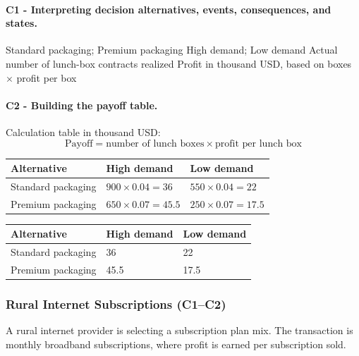 	\paragraph*{C1 - Interpreting decision alternatives, events, consequences, and states.}
	\label{subsec:problem6-community-bakery-lunch-boxes-c1}
	\DecisionElementsTable
	{Standard packaging; Premium packaging}
	{High demand; Low demand}
	{Actual number of lunch-box contracts realized}
	{Profit in thousand USD, based on boxes $\times$ profit per box}


	\paragraph*{C2 - Building the payoff table.}
	\label{subsec:problem6-community-bakery-lunch-boxes-c2}
	Calculation table in thousand USD:
	\[
	\text{Payoff}=\text{number of lunch boxes}\times\text{profit per lunch box}
	\]
	\begin{center}
		\begin{tabular}{lll}
			\toprule
			Alternative & High demand & Low demand \\
			\midrule
			Standard packaging & $900 \times 0.04 = 36$ & $550 \times 0.04 = 22$ \\
			Premium packaging & $650 \times 0.07 = 45.5$ & $250 \times 0.07 = 17.5$ \\
			\bottomrule
		\end{tabular}
	\end{center}

	\begin{center}
		\begin{tabular}{lll}
			\toprule
			Alternative & High demand & Low demand \\
			\midrule
			Standard packaging & 36 & 22 \\
			Premium packaging & 45.5 & 17.5 \\
			\bottomrule
		\end{tabular}
	\end{center}


	\subsubsection{Rural Internet Subscriptions (C1--C2)}
	\label{sec:problem7-rural-internet-subscriptions-c1-c2}
	A rural internet provider is selecting a subscription plan mix. The transaction is monthly broadband subscriptions, where profit is earned per subscription sold.

